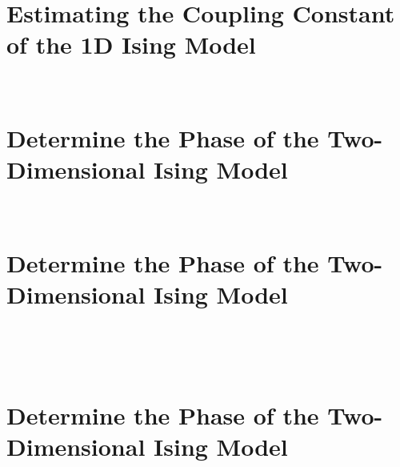\documentclass[11pt]{article}
\begin{document}
\newpage
\hypertarget{estimating-the-coupling-constant-of-the-1d-ising-model}{%
\section*{Estimating the Coupling Constant of the 1D Ising
Model}\label{estimating-the-coupling-constant-of-the-1d-ising-model8}}
    \begin{center}
    \end{center}
    { \hspace*{\fill} \\}
   
\newpage
\hypertarget{determine-the-phase-of-the-two-dimensional-ising-model}{%
\section*{Determine the Phase of the Two-Dimensional Ising
Model}\label{determine-the-phase-of-the-two-dimensional-ising-model}}

    \begin{center}
    \end{center}
    { \hspace*{\fill} \\}

\newpage
\hypertarget{determine-the-phase-of-the-two-dimensional-ising-model}{%
\section*{Determine the Phase of the Two-Dimensional Ising
Model}\label{determine-the-phase-of-the-two-dimensional-ising-model2}}

    \begin{center}
    \end{center}
    { \hspace*{\fill} \\}

    \begin{center}
    \end{center}
    { \hspace*{\fill} \\}

\newpage
\hypertarget{determine-the-phase-of-the-two-dimensional-ising-model}{%
\section*{Determine the Phase of the Two-Dimensional Ising
Model}\label{determine-the-phase-of-the-two-dimensional-ising-model4}}
\end{document}
